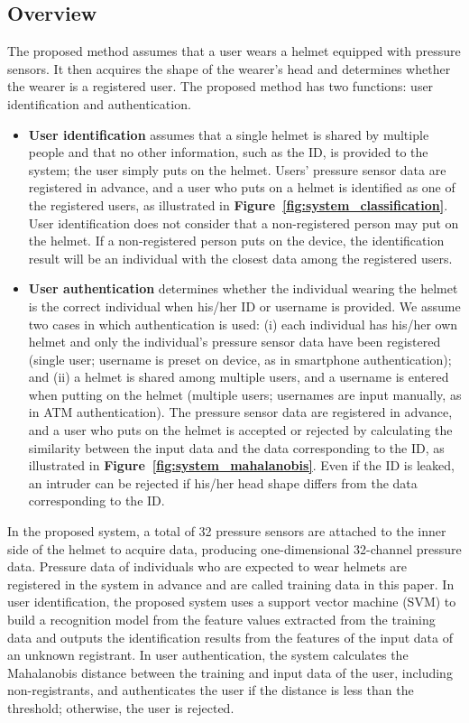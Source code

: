 \documentclass[sigchi,authordraft]{acmart}
\newcommand\figref[1]{\textbf{Figure~\ref{fig:#1}}}
\begin{document}
\subsection{Overview}
The proposed method assumes that a user wears a helmet equipped with pressure sensors. It then acquires the shape of the wearer's head and determines whether the wearer is a registered user. The proposed method has two functions: user identification and authentication.
\begin{itemize}
    \item {\bf User identification} assumes that a single helmet is shared by multiple people and that no other information, such as the ID, is provided to the system; the user simply puts on the helmet. Users' pressure sensor data are registered in advance, and a user who puts on a helmet is identified as one of the registered users, as illustrated in \figref{system_classification}. User identification does not consider that a non-registered person may put on the helmet. If a non-registered person puts on the device, the identification result will be an individual with the closest data among the registered users.
    
    \item {\bf User authentication} determines whether the individual wearing the helmet is the correct individual when his/her ID or username is provided. We assume two cases in which authentication is used: (i) each individual has his/her own helmet and only the individual's pressure sensor data have been registered (single user; username is preset on device, as in smartphone authentication); and (ii) a helmet is shared among multiple users, and a username is entered when putting on the helmet (multiple users; usernames are input manually, as in ATM authentication). The pressure sensor data are registered in advance, and a user who puts on the helmet is accepted or rejected by calculating the similarity between the input data and the data corresponding to the ID, as illustrated in \figref{system_mahalanobis}. Even if the ID is leaked, an intruder can be rejected if his/her head shape differs from the data corresponding to the ID.
\end{itemize}

In the proposed system, a total of 32 pressure sensors are attached to the inner side of the helmet to acquire data, producing one-dimensional 32-channel pressure data. Pressure data of individuals who are expected to wear helmets are registered in the system in advance and are called training data in this paper. In user identification, the proposed system uses a support vector machine (SVM) to build a recognition model from the feature values extracted from the training data and outputs the identification results from the features of the input data of an unknown registrant. In user authentication, the system calculates the Mahalanobis distance between the training and input data of the user, including non-registrants, and authenticates the user if the distance is less than the threshold; otherwise, the user is rejected.
\end{document}
